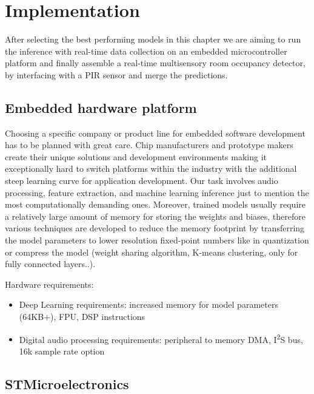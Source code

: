 \chapter{Implementation}
\label{chapter:implementation}


After selecting the best performing models in this chapter we are aiming to run the inference with real-time data collection on an embedded microcontroller platform and finally assemble a real-time multisensory room occupancy detector, by interfacing with a PIR sensor and merge the predictions.

\section{Embedded hardware platform}

Choosing a specific company or product line for embedded software development has to be planned with great care. Chip manufacturers and prototype makers create their unique solutions and development environments making it exceptionally hard to switch platforms within the industry with the additional steep learning curve for application development. Our task involves audio processing, feature extraction, and machine learning inference just to mention the most computationally demanding ones. Moreover, trained models usually require a relatively large amount of memory for storing the weights and biases, therefore various techniques are developed to reduce the memory footprint by transferring the model parameters to lower resolution fixed-point numbers like in quantization or compress the model (weight sharing algorithm, K-means clustering, only for fully connected layers..).


Hardware requirements:
\begin{itemize}
    \item Deep Learning requirements: increased memory for model parameters (64KB+), FPU, DSP instructions 
    \item Digital audio processing requirements:  peripheral to memory DMA, I\textsuperscript{2}S bus, 16k sample rate option
\end{itemize}

\section{STMicroelectronics}

